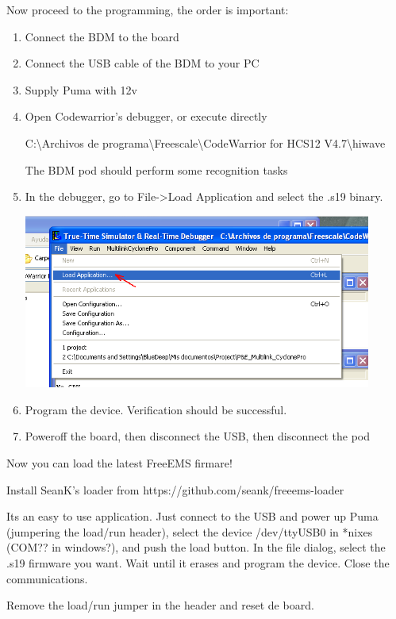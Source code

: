 \documentclass[12pt,a4paper,titlepage]{article}
\begin{document}
Now proceed to the programming, the order is important:
\begin{enumerate}
\item Connect the BDM to the board
\item Connect the USB cable of the BDM to your PC
\item Supply Puma with 12v
\item Open Codewarrior's debugger, or execute directly

C:\textbackslash Archivos de programa\textbackslash Freescale\textbackslash CodeWarrior for HCS12 V4.7\textbackslash hiwave
\newline

The BDM pod should perform some recognition tasks
\item In the debugger, go to File-\textgreater Load Application and select the .s19 binary.

\includegraphics[width=0.9\textwidth]{images/CW_debugger_load.png}

\item Program the device. Verification should be successful.
\item Poweroff the board, then disconnect the USB, then disconnect the pod
\end{enumerate}

Now you can load the latest FreeEMS firmare!
\newline

Install SeanK's loader from https://github.com/seank/freeems-loader
\newline

Its an easy to use application. Just connect to the USB and power up Puma (jumpering the load/run header), select the device /dev/ttyUSB0 in *nixes (COM?? in windows?), and push the load button. In the file dialog, select the .s19 firmware you want. Wait until it erases and program the device.
Close the communications.

Remove the load/run jumper in the header and reset de board.
\end{document}
